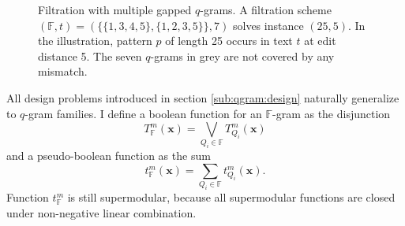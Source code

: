 \begin{figure}[t]
\begin{center}
\caption[Filtration with multiple gapped $q$-grams]{Filtration with multiple gapped $q$-grams. A filtration scheme $(\mathbb{F},t) = (\{ \{1, 3, 4, 5\}, \{1, 2, 3, 5\} \},7)$ solves instance $(25,5)$. In the illustration, pattern $p$ of length 25 occurs in text $t$ at edit distance 5. The seven $q$-grams in grey are not covered by any mismatch.}
\label{fig:qgrams-multiple}

\end{center}
\end{figure}

All design problems introduced in section \ref{sub:qgram:design} naturally generalize to $q$-gram families.
I define a boolean function for an $\mathbb{F}$-gram as the disjunction
\begin{equation}
\label{eq:family-bool}
T_{\mathbb{F}}^{m}(\mathbf{x}) = \bigvee_{Q_i \in \mathbb{F}} T_{Q_i}^{m}(\mathbf{x})
\end{equation}
and a pseudo-boolean function as the sum
\begin{equation}
\label{eq:family-pseudo}
t_{\mathbb{F}}^{m}(\mathbf{x}) = \sum_{Q_i \in \mathbb{F}} t_{Q_i}^{m}(\mathbf{x}).
\end{equation}
Function $t_{\mathbb{F}}^{m}$ is still supermodular, because all supermodular functions are closed under non-negative linear combination.





